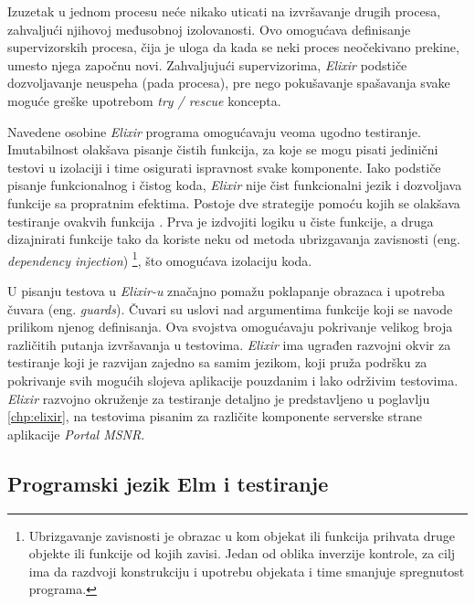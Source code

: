 \documentclass[12pt,oneside]{memoir}
\begin{document}
\par Izuzetak u jednom procesu neće nikako uticati na izvršavanje drugih procesa, zahvaljući njihovoj međusobnoj izolovanosti. Ovo omogućava definisanje supervizorskih procesa, čija je uloga da kada se neki proces neočekivano prekine, umesto njega započnu novi. Zahvaljujući supervizorima, \emph{Elixir} podstiče dozvoljavanje neuspeha (pada procesa), pre nego pokušavanje spašavanja svake moguće greške upotrebom \emph{try / rescue} koncepta.
\par Navedene osobine \emph{Elixir} programa omogućavaju veoma ugodno testiranje. Imutabilnost olakšava pisanje čistih funkcija, za koje se mogu pisati jedinični testovi u izolaciji i time osigurati ispravnost svake komponente. Iako podstiče pisanje funkcionalnog i čistog koda, \emph{Elixir} nije čist funkcionalni jezik i dozvoljava funkcije sa propratnim efektima.  Postoje dve strategije pomoću kojih se olakšava testiranje ovakvih funkcija \cite{testingelixir}. Prva je izdvojiti logiku u čiste funkcije, a druga dizajnirati funkcije tako da koriste neku od metoda ubrizgavanja zavisnosti (eng. \textit{dependency injection}) \footnote{Ubrizgavanje zavisnosti je obrazac u kom objekat ili funkcija prihvata druge objekte ili funkcije od kojih zavisi. Jedan od oblika inverzije kontrole, za cilj ima da razdvoji konstrukciju i upotrebu objekata i time smanjuje spregnutost programa.}, što omogućava izolaciju koda.  
\par U pisanju testova u \emph{Elixir-u} značajno pomažu poklapanje obrazaca i upotreba čuvara (eng. \emph{guards}). Čuvari su uslovi nad argumentima funkcije koji se navode prilikom njenog definisanja. Ova svojstva omogućavaju pokrivanje velikog broja različitih putanja izvršavanja u testovima. \emph{Elixir} ima ugrađen razvojni okvir za testiranje koji je razvijan zajedno sa samim jezikom, koji pruža podršku za pokrivanje svih mogućih slojeva aplikacije pouzdanim i lako održivim testovima. \emph{Elixir} razvojno okruženje za testiranje detaljno je predstavljeno u poglavlju \ref{chp:elixir}, na testovima pisanim za različite komponente serverske strane aplikacije \emph{Portal MSNR}. 
 
 
 
\subsection{Programski jezik Elm i testiranje}
\end{document}
